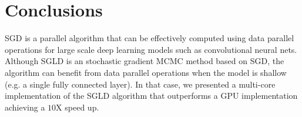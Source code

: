 \documentclass[9pt,lineno]{crone}
\begin{document}
\section{Conclusions}
SGD is a parallel algorithm that can be effectively computed using data parallel operations for large scale deep learning models such as convolutional neural nets. Although SGLD is an stochastic gradient MCMC method based on SGD, the algorithm can benefit from data parallel operations when the model is shallow (e.g. a single fully connected layer). In that case, we presented a multi-core implementation of the SGLD algorithm that outperforms a GPU implementation achieving a $10$X speed up. 


\end{document}
